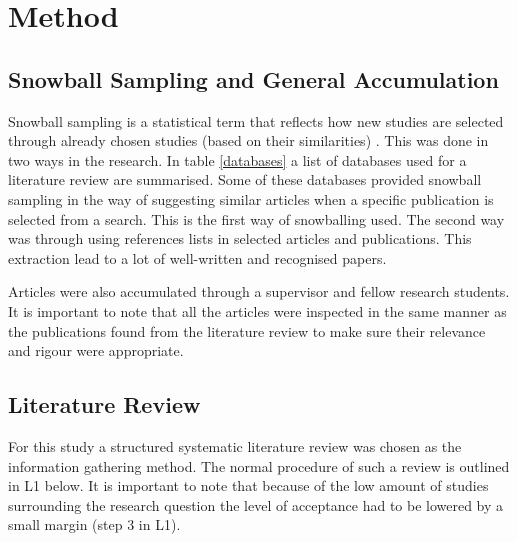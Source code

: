 \chapter{Method}

\minitoc


\newpage

\section{Snowball Sampling and General Accumulation}
\label{snowball}

Snowball sampling is a statistical term that reflects how new studies are selected through already chosen studies (based on their similarities) \cite{Goodman1961}. This was done in two ways in the research. In table \ref{databases} a list of databases used for a literature review are summarised. Some of these databases provided snowball sampling in the way of suggesting similar articles when a specific publication is selected from a search. This is the first way of snowballing used. The second way was through using references lists in selected articles and publications. This extraction lead to a lot of well-written and recognised papers.

Articles were also accumulated through a supervisor and fellow research students. It is important to note that all the articles were inspected in the same manner as the publications found from the literature review to make sure their relevance and rigour were appropriate.

\section{Literature Review}


For this study a structured systematic literature review was chosen as the information gathering method. The normal procedure of such a review is outlined in L1 below. It is important to note that because of the low amount of studies surrounding the research question the level of acceptance had to be lowered by a small margin (step 3 in L1). 

